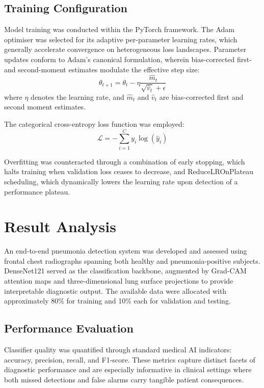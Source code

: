 \documentclass[conference]{IEEEtran}
\begin{document}
\subsection{Training Configuration}
Model training was conducted within the PyTorch framework. The Adam optimiser was selected for its adaptive per-parameter learning rates, which generally accelerate convergence on heterogeneous loss landscapes. Parameter updates conform to Adam's canonical formulation, wherein bias-corrected first- and second-moment estimates modulate the effective step size:
\begin{equation}
\theta_{t+1} = \theta_t - \eta \frac{\hat{m}_t}{\sqrt{\hat{v}_t} + \epsilon}
\end{equation}
where \( \eta \) denotes the learning rate, and \( \hat{m}_t \) and \( \hat{v}_t \) are bias-corrected first and second moment estimates.

The categorical cross-entropy loss function was employed:
\begin{equation}
\mathcal{L} = -\sum_{i=1}^{C} y_i \log(\hat{y}_i)
\end{equation}

Overfitting was counteracted through a combination of early stopping, which halts training when validation loss ceases to decrease, and ReduceLROnPlateau scheduling, which dynamically lowers the learning rate upon detection of a performance plateau.


\section{Result Analysis}

An end-to-end pneumonia detection system was developed and assessed using frontal chest radiographs spanning both healthy and pneumonia-positive subjects. DenseNet121 served as the classification backbone, augmented by Grad-CAM attention maps and three-dimensional lung surface projections to provide interpretable diagnostic output. The available data were allocated with approximately 80\% for training and 10\% each for validation and testing.

\subsection{Performance Evaluation}

Classifier quality was quantified through standard medical AI indicators: accuracy, precision, recall, and F1-score. These metrics capture distinct facets of diagnostic performance and are especially informative in clinical settings where both missed detections and false alarms carry tangible patient consequences.
\end{document}
